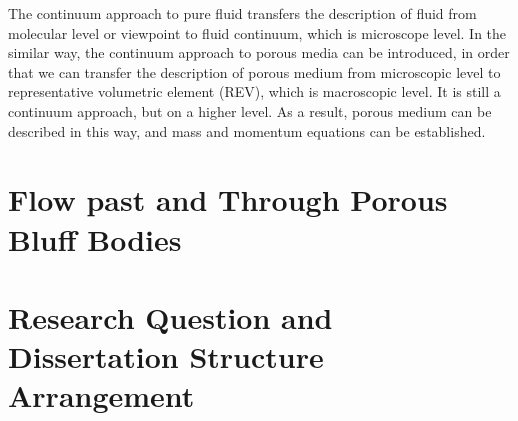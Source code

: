 The continuum approach to pure fluid transfers the description of fluid from molecular level or viewpoint to fluid continuum, which is microscope level. In the similar way, the continuum approach to porous media can be introduced, in order that we can transfer the description of porous medium from microscopic level to representative volumetric element (REV), which is macroscopic level. It is still a continuum approach, but on a higher level. As a result, porous medium can be described in this way, and mass and momentum equations can be established.


\section{Flow past and Through Porous Bluff Bodies}


\section{Research Question and Dissertation Structure Arrangement}
